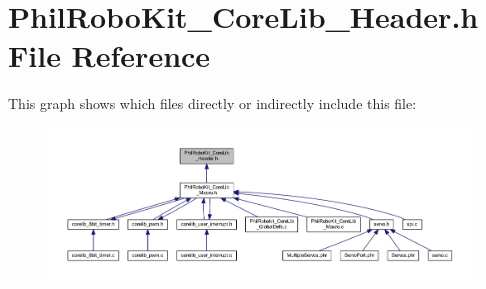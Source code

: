 \section{Phil\-Robo\-Kit\-\_\-\-Core\-Lib\-\_\-\-Header.\-h File Reference}
\label{_phil_robo_kit___core_lib___header_8h}
This graph shows which files directly or indirectly include this file\-:\nopagebreak
\begin{figure}[H]
\begin{center}
\leavevmode
\includegraphics[width=350pt]{_phil_robo_kit___core_lib___header_8h__dep__incl}
\end{center}
\end{figure}
